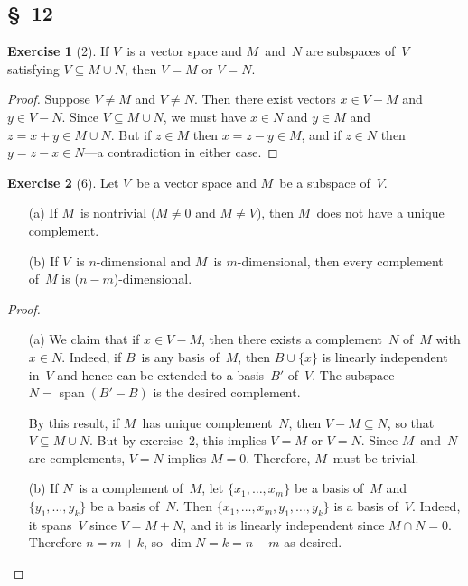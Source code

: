 \documentclass[letterpaper,12pt]{article}
\newcommand{\union}{\cup}
\newcommand{\sect}{\cap}
\DeclareMathOperator{\spn}{span}
\theoremstyle{definition}
\newtheorem*{exer}{Exercise}
\theoremstyle{remark}
\theoremstyle{direction}
\begin{document}
\subsection*{\S~12}
\begin{exer}[2]
If \(V\)~is a vector space and \(M\)~and~\(N\) are subspaces of~\(V\) satisfying \(V\subseteq M\union N\), then \(V=M\) or \(V=N\).
\end{exer}
\begin{proof}
Suppose \(V\ne M\) and \(V\ne N\). Then there exist vectors \(x\in V-M\) and \(y\in V-N\). Since \(V\subseteq M\union N\), we must have \(x\in N\) and \(y\in M\) and \(z=x+y\in M\union N\). But if \(z\in M\) then \(x=z-y\in M\), and if \(z\in N\) then \(y=z-x\in N\)---a contradiction in either case.
\end{proof}
\begin{exer}[6]
Let \(V\)~be a vector space and \(M\)~be a subspace of~\(V\).
\begin{enumerate}
\item[(a)] If \(M\)~is nontrivial (\(M\ne0\) and \(M\ne V\)), then \(M\)~does not have a unique complement.
\item[(b)] If \(V\)~is \(n\)-dimensional and \(M\)~is \(m\)-dimensional, then every complement of~\(M\) is (\(n-m\))-dimensional.
\end{enumerate}
\end{exer}
\begin{proof}\
\begin{enumerate}
\item[(a)] We claim that if \(x\in V-M\), then there exists a complement~\(N\) of~\(M\) with \(x\in N\). Indeed, if \(B\)~is any basis of~\(M\), then \(B\union\{x\}\) is linearly independent in~\(V\) and hence can be extended to a basis~\(B'\) of~\(V\). The subspace \(N=\spn(B'-B)\) is the desired complement.

By this result, if \(M\)~has unique complement~\(N\), then \(V-M\subseteq N\), so that \(V\subseteq M\union N\). But by exercise~2, this implies \(V=M\) or \(V=N\). Since \(M\)~and~\(N\) are complements, \(V=N\) implies \(M=0\). Therefore, \(M\)~must be trivial.
\item[(b)]
If \(N\)~is a complement of~\(M\), let \(\{x_1,\ldots,x_m\}\) be a basis of~\(M\) and \(\{y_1,\ldots,y_k\}\) be a basis of~\(N\). Then \(\{x_1,\ldots,x_m,y_1,\ldots,y_k\}\) is a basis of~\(V\). Indeed, it spans~\(V\) since \(V=M+N\), and it is linearly independent since \(M\sect N=0\). Therefore \(n=m+k\), so \(\dim N=k=n-m\) as desired.\qedhere
\end{enumerate}
\end{proof}
\end{document}

